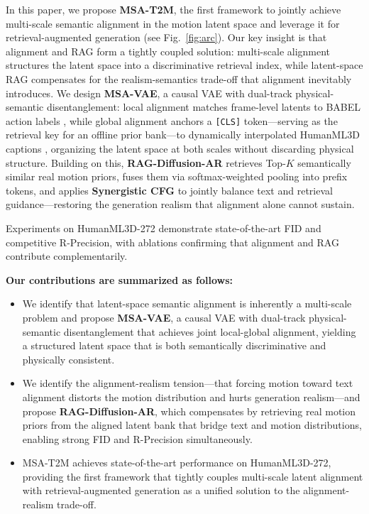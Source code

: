 \documentclass{article}
\begin{document}
In this paper, we propose \textbf{MSA-T2M}, the first framework to jointly achieve multi-scale semantic alignment in the motion latent space and leverage it for retrieval-augmented generation (see Fig.~\ref{fig:arc}).
Our key insight is that alignment and RAG form a tightly coupled solution: multi-scale alignment structures the latent space into a discriminative retrieval index, while latent-space RAG compensates for the realism-semantics trade-off that alignment inevitably introduces.
We design \textbf{MSA-VAE}, a causal VAE with dual-track physical-semantic disentanglement: local alignment matches frame-level latents to BABEL action labels \citep{punnakkal2021babel}, while global alignment anchors a \texttt{[CLS]} token---serving as the retrieval key for an offline prior bank---to dynamically interpolated HumanML3D captions \citep{Guo_2022_CVPR}, organizing the latent space at both scales without discarding physical structure.
Building on this, \textbf{RAG-Diffusion-AR} retrieves Top-$K$ semantically similar real motion priors, fuses them via softmax-weighted pooling into prefix tokens, and applies \textbf{Synergistic CFG} to jointly balance text and retrieval guidance---restoring the generation realism that alignment alone cannot sustain.

Experiments on HumanML3D-272 \citep{Guo_2022_CVPR,xiao2025motionstreamer,fan2025go} demonstrate state-of-the-art FID and competitive R-Precision, with ablations confirming that alignment and RAG contribute complementarily.

\textbf{Our contributions are summarized as follows:}
\begin{itemize}
    \item We identify that latent-space semantic alignment is inherently a multi-scale problem and propose \textbf{MSA-VAE}, a causal VAE with dual-track physical-semantic disentanglement that achieves joint local-global alignment, yielding a structured latent space that is both semantically discriminative and physically consistent.
    \item We identify the alignment-realism tension---that forcing motion toward text alignment distorts the motion distribution and hurts generation realism---and propose \textbf{RAG-Diffusion-AR}, which compensates by retrieving real motion priors from the aligned latent bank that bridge text and motion distributions, enabling strong FID and R-Precision simultaneously.
    \item MSA-T2M achieves state-of-the-art performance on HumanML3D-272, providing the first framework that tightly couples multi-scale latent alignment with retrieval-augmented generation as a unified solution to the alignment-realism trade-off.
\end{itemize}
\end{document}
